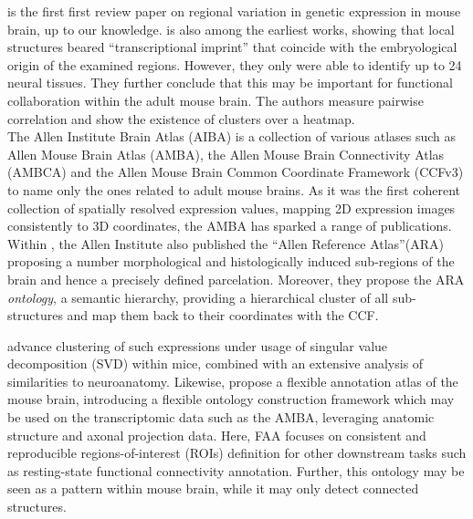 \documentclass[]{article}
\renewcommand{\cite}{\citep}
\begin{document}
\citet{pavlidis_analysis_2001} is the first first review paper on regional variation in genetic expression in mouse brain, up to our knowledge.  
\citet{zapala2005adult} is also among the earliest works, showing that local structures beared ``transcriptional imprint'' that coincide with the embryological origin of the examined regions. However, they only were able to identify up to 24 neural tissues. They further conclude that this may be important for functional collaboration within the adult mouse brain. The authors measure pairwise correlation and show the existence of clusters over a heatmap. \\

The Allen Institute Brain Atlas (AIBA) is a collection of various atlases such as Allen Mouse Brain Atlas (AMBA)\cite{MouseBrainAtlas, daigle2018suite}, the Allen Mouse Brain Connectivity Atlas (AMBCA) \cite{oh2014mesoscale, harris2019hierarchical} and the Allen Mouse Brain Common Coordinate Framework (CCFv3) \cite{wang2020allen} to name only the ones related to adult mouse brains. As it was the first coherent collection of spatially resolved expression values, mapping 2D expression images consistently to 3D coordinates, the AMBA has sparked a range of publications. Within \citet{MouseBrainAtlas}, the Allen Institute also published the ``Allen Reference Atlas''(ARA) proposing a number morphological and histologically induced sub-regions of the brain and hence a precisely defined parcelation. Moreover, they propose the ARA \textit{ontology}, a semantic hierarchy, providing a hierarchical cluster of all sub-structures and map them back to their coordinates with the CCF. 


\citet{bohland2010clustering} advance clustering of such expressions under usage of singular value decomposition (SVD) within mice, combined with an extensive analysis of similarities to neuroanatomy.
Likewise, \citet{takata_flexible_2021} propose a flexible annotation atlas of the mouse brain, introducing a flexible ontology construction framework which may be used on the transcriptomic data such as the AMBA, leveraging anatomic structure and axonal projection data. Here, FAA focuses on consistent and reproducible regions-of-interest (ROIs) definition for other downstream tasks such as resting-state functional connectivity annotation. Further, this ontology may be seen as a pattern within mouse brain, while it may only detect connected structures. 
\end{document}
